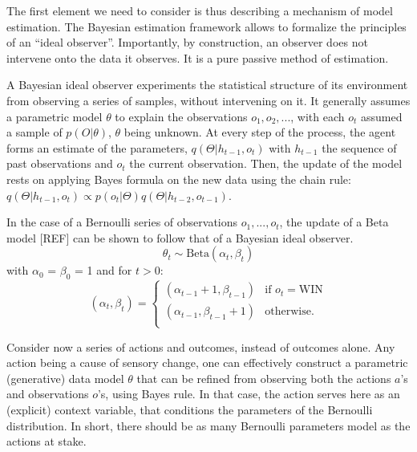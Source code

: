 \documentclass[10pt,letterpaper]{article}
\begin{document}

The first element we need to consider is thus describing a mechanism of model estimation. The Bayesian estimation framework allows to formalize the principles of an ``ideal observer''.
Importantly, by construction, an observer does not intervene onto the data it observes. It is a pure passive method of estimation.    

A Bayesian ideal observer \cite{geisler1989sequential} experiments the statistical structure of its environment from observing a series of samples, without intervening on it. It generally assumes a parametric model $\theta$ to explain the observations $o_1, o_2, ...$, with each $o_t$ assumed a sample of $p(O|\theta)$, $\theta$ being unknown. At every step of the process, the agent forms an estimate of the parameters, $q(\Theta|h_{t-1}, o_t)$ with $h_{t-1}$ the sequence of past observations and $o_t$ the current observation. Then, the update of the model rests on applying Bayes formula on the new data using the chain rule: $q(\Theta|h_{t-1}, o_t) \propto p(o_t|\Theta) q(\Theta|h_{t-2}, o_{t-1})$.

In the case of a Bernoulli series of observations $o_1,...,o_t$, the update of a Beta model [REF] can be shown to follow that of a Bayesian ideal observer. 
\begin{equation}
    \theta_t \sim \text{Beta}(\alpha_t,\beta_t)
\end{equation}
with $\alpha_0$ = $\beta_0$ = 1 and for $t>0$:
\begin{equation}
    (\alpha_t,\beta_t) = \left\{
    \begin{array}{ll}
        (\alpha_{t-1}+1,\beta_{t-1}) & \mbox{if $o_t=\text{WIN}$} \\
        (\alpha_{t-1},\beta_{t-1}+1) & \mbox{otherwise}. \\
    \end{array}
\right.
\end{equation}

Consider now a series of actions and outcomes, instead of outcomes alone. 
Any action being a cause of sensory change, one can effectively construct a parametric (generative) data model $\theta$ that can be refined from observing both the actions $a$'s and observations $o$'s, using Bayes rule. In that case, %
the action serves here as an (explicit) context variable, that conditions the parameters of the Bernoulli distribution. In short, there should be as many Bernoulli parameters model as the actions at stake. 
\end{document}
